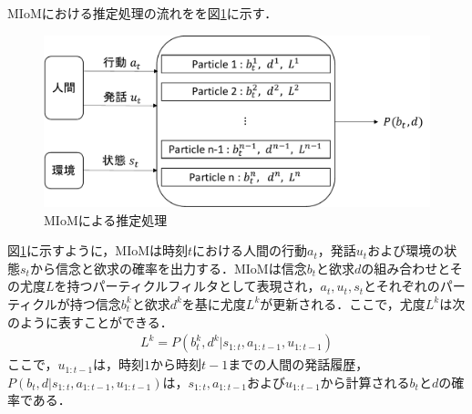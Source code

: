 \par
MIoMにおける推定処理の流れをを図\ref{fig:sys_arc}に示す．
\begin{figure}[htbp]
  \begin{center}
    \includegraphics[scale=0.75]{./bt1.pdf}
    \caption{MIoMによる推定処理}
    \label{fig:sys_arc}
  \end{center}
\end{figure}
図\ref{fig:sys_arc}に示すように，MIoMは時刻$t$における人間の行動$a_t$，発話$u_t$および環境の状態$s_t$から信念と欲求の確率を出力する．MIoMは信念$b_t$と欲求$d$の組み合わせとその尤度$L$を持つパーティクルフィルタとして表現され，$a_t,u_t,s_t$とそれぞれのパーティクルが持つ信念$b_t^k$と欲求$d^k$を基に尤度$L^k$が更新される．ここで，尤度$L^k$は次のように表すことができる．
\begin{equation}
  \begin{split}
  \label{pf}
  L^k=P(b_t^k,d^k|s_{1:t},a_{1:t-1},u_{1:t-1})
  \end{split}
\end{equation}
ここで，$u_{1:t-1}$は，時刻$1$から時刻$t-1$までの人間の発話履歴，$P(b_t,d|s_{1:t},a_{1:t-1},u_{1:t-1})$は，$s_{1:t},a_{1:t-1}およびu_{1:t-1}$から計算される$b_t$と$d$の確率である．

